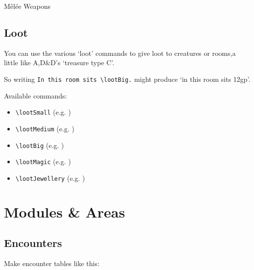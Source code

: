 \documentclass[a4paper,openany]{book}
\begin{document}
\begin{multicols}{2}
\begin{nametable}[lYYYY]{M\^{e}l\'{e}e Weapons}
  \Dagger

  \greataxe

  \spear

  \end{nametable}


\subsection{Loot}

You can use the various `loot' commands to give loot to creatures or rooms,a little like A,D\&D's `treasure type C'.

So writing \verb"In this room sits \lootBig." might produce `in this room sits 12gp'.

Available commands:

\begin{itemize}

  \item
  \verb"\lootSmall" (e.g. \lootSmall)
  \item
  \verb"\lootMedium" (e.g. \lootMedium)
  \item
  \verb"\lootBig" (e.g. \lootBig)
  \item
  \verb"\lootMagic" (e.g. \lootMagic)
  \item
  \verb"\lootJewellery" (e.g. \lootJewellery)

\end{itemize}

\end{multicols}

\section{Modules \& Areas}

\subsection{Encounters}

Make encounter tables like this:
\end{document}
